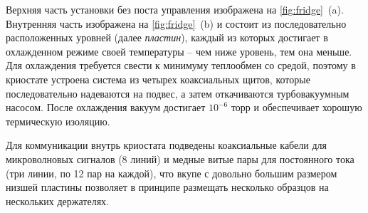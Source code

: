 \documentclass[12pt, twoside]{report}
\numberwithin{equation}{section}
\numberwithin{figure}{section}
\begin{document}
Верхняя часть установки без поста управления изображена на \autoref{fig:fridge}~(a). Внутренняя часть изображена на \autoref{fig:fridge}~(b) и состоит из последовательно расположенных уровней (далее \textit{пластин}), каждый из которых достигает в охлажденном режиме своей температуры -- чем ниже уровень, тем она меньше. Для охлаждения требуется свести к минимуму теплообмен со средой, поэтому в криостате устроена система из четырех коаксиальных щитов, которые последовательно надеваются на подвес, а затем откачиваются турбовакуумным насосом. После охлаждения вакуум достигает $10^{-6}$ торр и обеспечивает хорошую термическую изоляцию.

Для коммуникации внутрь криостата подведены коаксиальные кабели для микроволновых сигналов (8 линий) и медные витые пары для постоянного тока (три линии, по 12 пар на каждой), что вкупе с довольно большим размером низшей пластины позволяет в принципе размещать несколько образцов на нескольких держателях.
\end{document}
